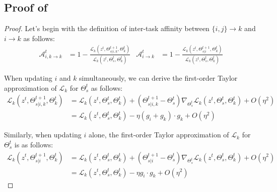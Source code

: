 \subsection{Proof of }
\label{Append:theorem3}

\theomthree*
\begin{proof}
Let's begin with the definition of inter-task affinity between $\{i, j\}\rightarrow k$ and $i \rightarrow k$ as follows:
\begin{align}
    \mathcal{A}_{i,k \rightarrow k}^t &= 1-\frac{\mathcal{L}_k(z^t, \Theta_{s|i,k}^{t+1}, \Theta_k^{t})}{\mathcal{L}_k(z^t, \Theta_{s}^t, \Theta_k^{t})} &
    \mathcal{A}_{i\rightarrow k}^t &= 1-\frac{\mathcal{L}_k(z^t, \Theta_{s|i}^{t+1}, \Theta_k^{t})}{\mathcal{L}_k(z^t, \Theta_{s}^t, \Theta_k^{t})}
    \label{eq:theo5_affin}
\end{align}

When updating $i$ and $k$ simultaneously, we can derive the first-order Taylor approximation of $\mathcal{L}_k$ for $\Theta_s^t$ as follows:
\begin{align}
    \mathcal{L}_k (z^t, \Theta_{s|i,k}^{t+1}, \Theta_k^t) &= \mathcal{L}_k (z^t, \Theta_s^t, \Theta_k^t) + (\Theta_{s|i,k}^{t+1} - \Theta_s^t) \nabla_{\Theta_s^t} \mathcal{L}_k (z^t, \Theta_s^t, \Theta_k^t) + O(\eta^2)\\
    &= \mathcal{L}_k (z^t, \Theta_s^t, \Theta_k^t) - \eta (g_i + g_k)\cdot g_k + O(\eta^2)
\end{align}

Similarly, when updating $i$ alone, the first-order Taylor approximation of $\mathcal{L}_k$ for $\Theta_s^t$ is as follows:
\begin{align}
    \mathcal{L}_k (z^t, \Theta_{s|i}^{t+1}, \Theta_k^t) &= \mathcal{L}_k (z^t, \Theta_s^t, \Theta_k^t) + (\Theta_{s|i}^{t+1} - \Theta_s^t) \nabla_{\Theta_s^t} \mathcal{L}_k (z^t, \Theta_s^t, \Theta_k^t) + O(\eta^2)\\
    &= \mathcal{L}_k (z^t, \Theta_s^t, \Theta_k^t) - \eta g_i\cdot g_k + O(\eta^2)
\end{align}


\end{proof}
